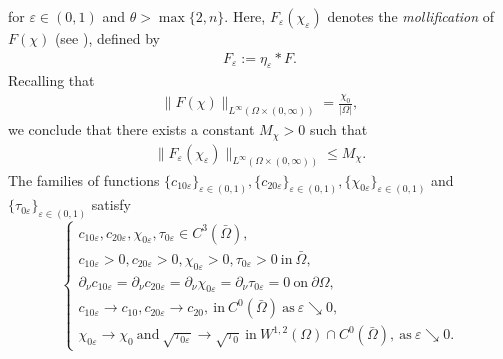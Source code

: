 \documentclass[a4paper,10pt]{article}
\theoremstyle{definition}
\begin{document}
for $\varepsilon \in (0, 1)$ and $\theta > \max\{2, n\}$. Here, $F_\varepsilon(\chi_\varepsilon)$ denotes the \emph{mollification} of $F(\chi)$ (see \cite[Appendix C: Calculus, particularly C5]{evans2022partial}), defined by
\begin{align*}
    F_\varepsilon := \eta_\varepsilon \ast F.
\end{align*}
Recalling that
\begin{align*}
     \|F(\chi)\|_{L^\infty(\Omega\times(0,\infty))}
   = \frac{\chi_0}{|\Omega|},
\end{align*}
we conclude that there exists a constant $M_\chi > 0$ such that
\begin{align}
\label{mol_bound_short}
   \|F_\varepsilon(\chi_\varepsilon)\|_{L^\infty(\Omega\times(0,\infty))}
   \le M_\chi.
\end{align}
The families of functions $\{c_{10\varepsilon}\}_{\varepsilon \in (0, 1)}, \{c_{20\varepsilon}\}_{\varepsilon \in (0, 1)}, \{\chi_{0\varepsilon}\}_{\varepsilon \in (0, 1)}$ and $\{\tau_{0\varepsilon}\}_{\varepsilon \in (0, 1)}$ satisfy
\begin{equation}
\label{reg_assumptions}
  \begin{cases}
    c_{10\varepsilon}, c_{20\varepsilon}, \chi_{0\varepsilon}, \tau_{0\varepsilon} \in C^3(\bar{\Omega}),                                                                   \\[3pt]
    c_{10\varepsilon} > 0, c_{20\varepsilon} > 0, \chi_{0\varepsilon} > 0, \tau_{0\varepsilon} > 0 ~\text{in}~ \bar{\Omega},                                                \\[3pt]
    \partial_\nu c_{10\varepsilon} = \partial_\nu c_{20\varepsilon} = \partial_\nu \chi_{0\varepsilon} = \partial_\nu \tau_{0\varepsilon} = 0 ~\text{on}~ \partial \Omega,  \\[3pt]
    c_{10\varepsilon} \to c_{10}, c_{20\varepsilon} \to c_{20},  ~\text{in}~ C^0(\bar{\Omega}) ~\text{as}~ \varepsilon \searrow 0,                       \\[3pt]
    \chi_{0\varepsilon}\to \chi_0 ~\text{and}~ \sqrt{\tau_{0\varepsilon}} \to \sqrt{\tau_0} ~\text{in}~ W^{1, 2}(\Omega) \cap C^0(\bar{\Omega}),  ~\text{as}~ \varepsilon \searrow 0.
  \end{cases}
\end{equation}
\end{document}

